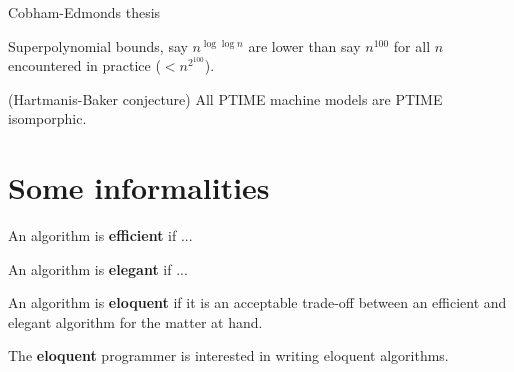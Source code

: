 Cobham-Edmonds thesis

Superpolynomial bounds, say $n^{\log{\log{n}}}$ are lower than say $n^{100}$ for all
$n$ encountered in practice ($<n^{2^{100}}$).

\begin{conjecture} \label{cjt:hartmanis-baker} (Hartmanis-Baker conjecture) All
PTIME machine models are PTIME isomporphic. \end{conjecture}

\section{Some informalities}

\begin{notion} An algorithm is \textbf{efficient} if ... \end{notion}

\begin{notion} An algorithm is \textbf{elegant} if ... \end{notion}

\begin{notion} An algorithm is \textbf{eloquent} if it is an acceptable
trade-off between an efficient and elegant algorithm for the matter at hand.
\end{notion}

\begin{notion} The \textbf{eloquent} programmer is interested in writing
eloquent algorithms. \end{notion}
